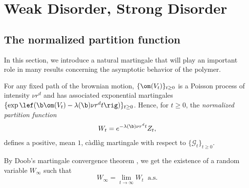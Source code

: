 \chapter{Weak Disorder, Strong Disorder } \label{ch:3}
\section{The normalized partition function} In this section, we introduce a natural martingale that will play an important  role in many results concerning the asymptotic behavior of the polymer. 

For any fixed path of the brownian motion, $\{\om(V_t)\}_{t\geq 0}$ is a Poisson process of intensity $\nu r^d$ and has associated exponential martingales $\{\exp \lef(\b \om(V_t)-\lambda(\b)\nu r^d t\rig)\}_{t\geq 0}$. Hence, for	$t\geq 0$, the \emph{normalized partition function}
\begin{equation} \label{eq:Wt}
W_t = e^{-\lambda (\b)\nu r^d t} Z_t,
\end{equation}
defines a positive, mean $1$, c\`adl\`ag martingale with respect to $\{\mathcal{G}_t\}_{t\geq 0}$.

By Doob's martingale convergence theorem \cite[Chapter 2, Corollary 2.11]{revuzYor}, we get the existence of a random variable $W_\infty$ such that
\begin{equation}
W_\infty = \lim_{t\to\infty} W_t \  \text{ a.s.}
\end{equation} 

